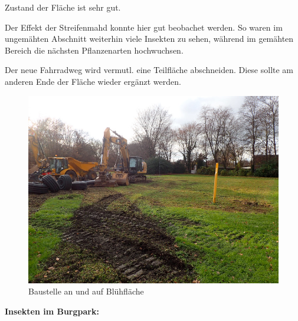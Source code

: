\documentclass[10pt]{article}
\begin{document}
\begin{flushleft}
Zustand der Fläche ist sehr gut.

Der Effekt der Streifenmahd konnte hier gut beobachet werden.
So waren im ungemähten Abschnitt weiterhin viele Insekten zu sehen, während im gemähten Bereich die nächsten Pflanzenarten hochwuchsen.

Der neue Fahrradweg wird vermutl. eine Teilfläche abschneiden. 
Diese sollte am anderen Ende der Fläche wieder ergänzt werden.


\begin{figure}[h!]
  \centering
  \includegraphics[width=0.45\linewidth]{img/burgpark/baustelle.jpg}
  \caption{Baustelle an und auf Blühfläche}
\end{figure}

\end{flushleft}

\newpage

\textbf{Insekten im Burgpark:}
\end{document}
